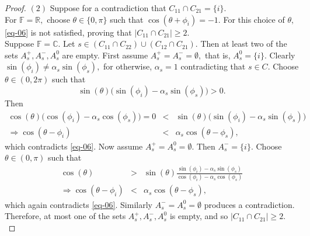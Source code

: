 \documentclass[10pt,a4paper]{amsart}
\begin{document}
\begin{proof}
$(2)$ 
Suppose for a contradiction that  $C_{11}\cap C_{21}= \{i\}.$ \\
For $\mathbb{F}=\mathbb{R},$  choose $\theta\in \{0,\pi\}$ such that $\cos(\theta+\phi_i)=-1.$ For this choice of $\theta,$ \eqref{eq-06} is not satisfied, proving that   $|C_{11}\cap C_{21}|\geq 2.$\\
Suppose $\mathbb{F}=\mathbb{C}.$ Let $s\in(C_{11}\cap C_{22})\cup (C_{12}\cap C_{21}).$ Then at least two of the sets $A_s^+,A_s^-,A_s^0$ are empty. First assume $A_s^+=A_s^-=\emptyset,$ that is, $A_s^0=\{i\}.$ Clearly $\sin(\phi_i)\neq \alpha_s\sin(\phi_s),$ for otherwise, $\alpha_s=1$ contradicting that $s\in C.$ 
Choose $\theta\in(0,2\pi)$ such that $$\sin(\theta)\Big(\sin(\phi_i)-\alpha_s\sin(\phi_s)\Big)>0 .$$ Then  
\begin{eqnarray*}
	\cos(\theta)\Big(\cos(\phi_i)-\alpha_s \cos(\phi_s)\Big)=0&<&\sin(\theta) \Big(\sin(\phi_i)-\alpha_s \sin(\phi_s)\Big)\\
	\Rightarrow \cos(\theta-\phi_i)&<&\alpha_s\cos(\theta-\phi_s), %
\end{eqnarray*} 
which contradicts \eqref{eq-06}.  Now assume $A_s^+=A_s^0=\emptyset.$ Then $A_s^-=\{i\}.$ Choose $\theta\in (0,\pi)$ such that 
\begin{eqnarray*}
	\cos(\theta)&>& \sin(\theta) \frac{\sin(\phi_i)-\alpha_s \sin(\phi_s)}{\cos(\phi_i)-\alpha_s \cos(\phi_s)}\\
	\Rightarrow \cos(\theta-\phi_i)&<&\alpha_s\cos(\theta-\phi_s),%
\end{eqnarray*}
which again contradicts \eqref{eq-06}. Similarly $A_s^-=A_s^0=\emptyset$ produces a contradiction. Therefore, at most one of the sets $A_s^+,A_s^-,A_s^0$ is empty, and so $|C_{11}\cap C_{21}|\geq 2.$\\

\end{proof}
\end{document}
